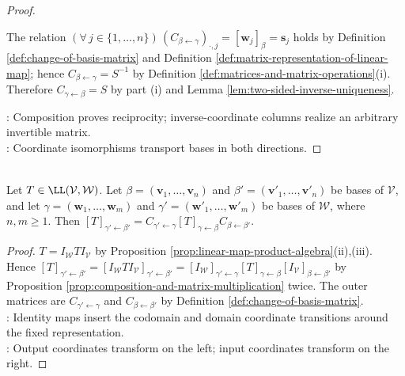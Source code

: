 \begin{theorem}
\begin{proof}
\begin{enumerate}[label=(\roman*)]
The relation $(\forall\,j\in\{1,\ldots,n\})\,(C_{\beta\leftarrow\gamma})_{\cdot,j}=[\mathbf{w}_j]_{\beta}=\mathbf{s}_j$ holds by Definition \ref{def:change-of-basis-matrix} and Definition \ref{def:matrix-representation-of-linear-map}; hence $C_{\beta\leftarrow\gamma}=S^{-1}$ by Definition \ref{def:matrices-and-matrix-operations}(i). Therefore $C_{\gamma\leftarrow\beta}=S$ by part (i) and Lemma \ref{lem:two-sided-inverse-uniqueness}.
\end{enumerate}
: Composition proves reciprocity; inverse-coordinate columns realize an arbitrary invertible matrix.\\
: Coordinate isomorphisms transport bases in both directions.
\end{proof}
\end{theorem}

\begin{theorem} \label{thm:two-sided-change-of-basis-for-linear-maps} \\
Let $T\in\LL(\mathcal{V},\mathcal{W})$. Let $\beta=(\mathbf{v}_1,\ldots,\mathbf{v}_n)$ and $\beta'=(\mathbf{v}'_1,\ldots,\mathbf{v}'_n)$ be bases of $\mathcal{V}$, and let $\gamma=(\mathbf{w}_1,\ldots,\mathbf{w}_m)$ and $\gamma'=(\mathbf{w}'_1,\ldots,\mathbf{w}'_m)$ be bases of $\mathcal{W}$, where $n,m\geq1$. Then $[T]_{\gamma'\leftarrow\beta'}=C_{\gamma'\leftarrow\gamma}[T]_{\gamma\leftarrow\beta}C_{\beta\leftarrow\beta'}$.
\begin{proof}
$T=I_{\mathcal{W}}TI_{\mathcal{V}}$ by Proposition \ref{prop:linear-map-product-algebra}(ii),(iii). Hence $[T]_{\gamma'\leftarrow\beta'}=[I_{\mathcal{W}}TI_{\mathcal{V}}]_{\gamma'\leftarrow\beta'}=[I_{\mathcal{W}}]_{\gamma'\leftarrow\gamma}[T]_{\gamma\leftarrow\beta}[I_{\mathcal{V}}]_{\beta\leftarrow\beta'}$ by Proposition \ref{prop:composition-and-matrix-multiplication} twice. The outer matrices are $C_{\gamma'\leftarrow\gamma}$ and $C_{\beta\leftarrow\beta'}$ by Definition \ref{def:change-of-basis-matrix}.\\
: Identity maps insert the codomain and domain coordinate transitions around the fixed representation.\\
: Output coordinates transform on the left; input coordinates transform on the right.
\end{proof}
\end{theorem}
